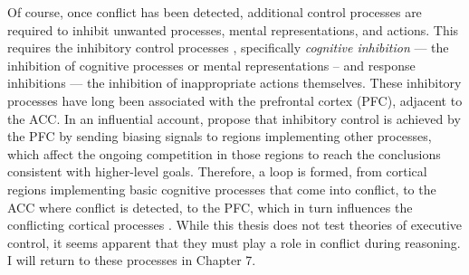 Of course, once conflict has been detected,
additional control processes are required
to inhibit unwanted processes, mental representations, and actions.
This requires the inhibitory control processes \citep{Diamond2013},
specifically \emph{cognitive inhibition}
--- the inhibition of cognitive processes or mental representations --
and response inhibitions
--- the inhibition of inappropriate actions themselves.
These inhibitory processes have long been associated with
the prefrontal cortex (PFC), adjacent to the ACC.
In an influential account, \citet{Miller2001} propose that
inhibitory control is achieved by the PFC
by sending biasing signals to regions implementing other processes,
which affect the ongoing competition in those regions
to reach the conclusions consistent with higher-level goals.
Therefore, a loop is formed,
from cortical regions implementing basic cognitive processes
that come into conflict,
to the ACC where conflict is detected,
to the PFC, which in turn influences the conflicting cortical processes
\citep{Yeung2004}.
While this thesis does not test theories of executive control,
it seems apparent that they must play a role
in conflict during reasoning.
I will return to these processes in Chapter 7.




